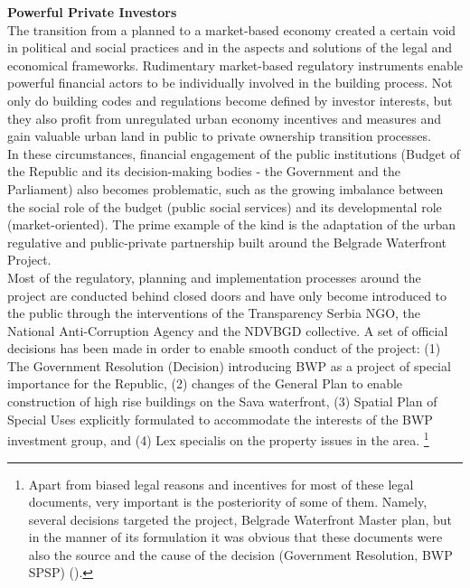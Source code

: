 \documentclass[11pt]{report}
\begin{document}
\textbf{Powerful Private Investors}
\\
The transition from a planned to a market-based economy created a certain void in political and social practices and in the aspects and solutions of the legal and economical frameworks. Rudimentary market-based regulatory instruments enable powerful financial actors to be individually involved in the building process. Not only do building codes and regulations become defined by investor interests, but they also profit from unregulated urban economy incentives and measures and gain valuable urban land in public to private ownership transition processes.
\\

In these circumstances, financial engagement of the public institutions (Budget of the Republic and its decision-making bodies - the Government and the Parliament) also becomes problematic, such as the growing imbalance between the social role of the budget (public social services) and its developmental role (market-oriented). The prime example of the kind is the adaptation of the urban regulative and public-private partnership built around the Belgrade Waterfront Project.
\\

Most of the regulatory, planning and implementation processes around the project are conducted behind closed doors and have only become introduced to the public through the interventions of the Transparency Serbia NGO, the National Anti-Corruption Agency and the NDVBGD collective. A set of official decisions has been made in order to enable smooth conduct of the project: (1) The Government Resolution (Decision) introducing BWP as a project of special importance for the Republic, (2) changes of the General Plan to enable construction of high rise buildings on the Sava waterfront, (3) Spatial Plan of Special Uses explicitly formulated to accommodate the interests of the BWP investment group, and (4) Lex specialis on the property issues in the area.
\footnote{Apart from biased legal reasons and incentives for most of these legal documents, very important is the posteriority of some of them. Namely, several decisions targeted the project, Belgrade Waterfront Master plan, but in the manner of its formulation it was obvious that these documents were also the source and the cause of the decision (Government Resolution, BWP SPSP) (\href{Izvestaj}{\citealt{pravni_skener_alternativni_2016}}).}
\\
\end{document}
